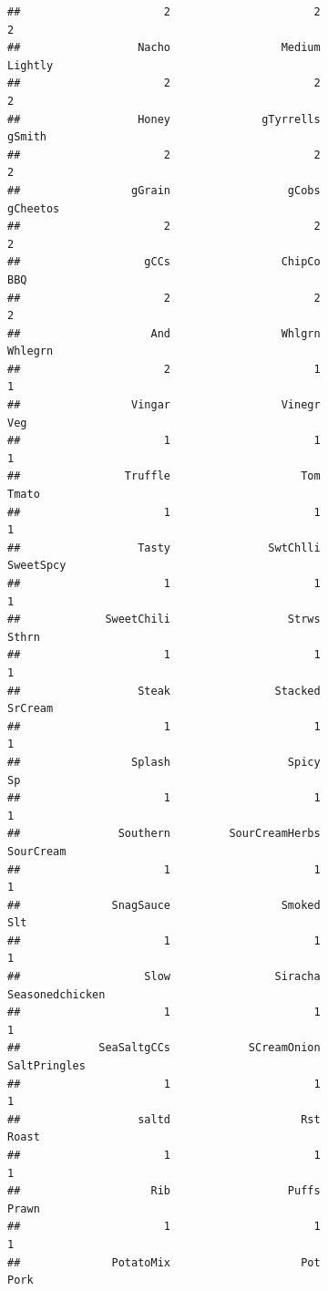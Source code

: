 \documentclass[
]{article}
\begin{document}
\begin{verbatim}
##                      2                      2                      2 
##                  Nacho                 Medium                Lightly 
##                      2                      2                      2 
##                  Honey              gTyrrells                 gSmith 
##                      2                      2                      2 
##                 gGrain                  gCobs               gCheetos 
##                      2                      2                      2 
##                   gCCs                 ChipCo                    BBQ 
##                      2                      2                      2 
##                    And                 Whlgrn                Whlegrn 
##                      2                      1                      1 
##                 Vingar                 Vinegr                    Veg 
##                      1                      1                      1 
##                Truffle                    Tom                  Tmato 
##                      1                      1                      1 
##                  Tasty               SwtChlli              SweetSpcy 
##                      1                      1                      1 
##             SweetChili                  Strws                  Sthrn 
##                      1                      1                      1 
##                  Steak                Stacked                SrCream 
##                      1                      1                      1 
##                 Splash                  Spicy                     Sp 
##                      1                      1                      1 
##               Southern         SourCreamHerbs              SourCream 
##                      1                      1                      1 
##              SnagSauce                 Smoked                    Slt 
##                      1                      1                      1 
##                   Slow                Siracha        Seasonedchicken 
##                      1                      1                      1 
##            SeaSaltgCCs            SCreamOnion           SaltPringles 
##                      1                      1                      1 
##                  saltd                    Rst                  Roast 
##                      1                      1                      1 
##                    Rib                  Puffs                  Prawn 
##                      1                      1                      1 
##              PotatoMix                    Pot                   Pork 

\end{verbatim}
\end{document}

